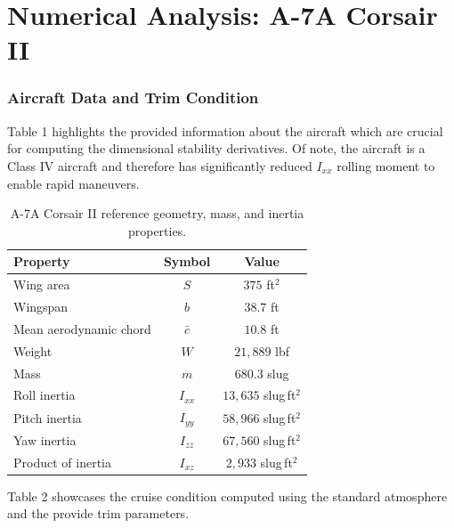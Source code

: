 \documentclass[11pt]{article}
\newcommand{\cbar}{\bar{c}}
\newcommand{\Ixx}{I_{xx}}
\newcommand{\Iyy}{I_{yy}}
\newcommand{\Izz}{I_{zz}}
\newcommand{\Ixz}{I_{xz}}
\begin{document}
\part*{Numerical Analysis: A-7A Corsair II}

\section{Aircraft Data and Trim Condition}

Table 1 highlights the provided information about the aircraft which are crucial for computing the
dimensional stability derivatives.
Of note, the aircraft is a Class IV aircraft and therefore has significantly reduced $I_{xx}$ rolling moment to enable
rapid maneuvers.

\begin{table}[h]\label{tab:table_1}
\centering
\caption{A-7A Corsair II reference geometry, mass, and inertia properties.}
\begin{tabular}{lcc}
\toprule
\textbf{Property} & \textbf{Symbol} & \textbf{Value} \\
\midrule
Wing area              & $S$    & $375$ ft$^2$ \\
Wingspan               & $b$    & $38.7$ ft \\
Mean aerodynamic chord & $\cbar$ & $10.8$ ft \\
Weight                 & $W$    & $21{,}889$ lbf \\
Mass                   & $m$    & $680.3$ slug \\
Roll inertia           & $\Ixx$ & $13{,}635$ slug\,ft$^2$ \\
Pitch inertia          & $\Iyy$ & $58{,}966$ slug\,ft$^2$ \\
Yaw inertia            & $\Izz$ & $67{,}560$ slug\,ft$^2$ \\
Product of inertia     & $\Ixz$ & $2{,}933$ slug\,ft$^2$ \\
\bottomrule
\end{tabular}
\end{table}

Table 2 showcases the cruise condition computed using the standard atmosphere and the provide trim parameters.
\end{document}
